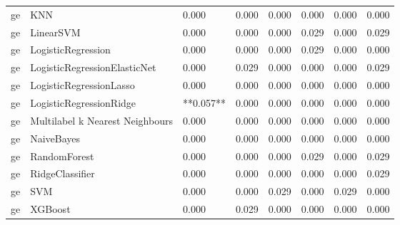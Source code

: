 \begin{tabular}{llllllll}
      ge &                             KNN &     0.000 &                     0.000 &                 0.000 &                  0.000 &                                   0.000 &     0.000 \\
      ge &                       LinearSVM &     0.000 &                     0.000 &                 0.000 &                  0.029 &                                   0.000 &     0.029 \\
      ge &              LogisticRegression &     0.000 &                     0.000 &                 0.000 &                  0.029 &                                   0.000 &     0.000 \\
      ge &    LogisticRegressionElasticNet &     0.000 &                     0.029 &                 0.000 &                  0.000 &                                   0.000 &     0.029 \\
      ge &         LogisticRegressionLasso &     0.000 &                     0.000 &                 0.000 &                  0.000 &                                   0.000 &     0.000 \\
      ge &         LogisticRegressionRidge & **0.057** &                     0.000 &                 0.000 &                  0.000 &                                   0.000 &     0.000 \\
      ge & Multilabel k Nearest Neighbours &     0.000 &                     0.000 &                 0.000 &                  0.000 &                                   0.000 &     0.000 \\
      ge &                      NaiveBayes &     0.000 &                     0.000 &                 0.000 &                  0.000 &                                   0.000 &     0.000 \\
      ge &                    RandomForest &     0.000 &                     0.000 &                 0.000 &                  0.029 &                                   0.000 &     0.029 \\
      ge &                 RidgeClassifier &     0.000 &                     0.000 &                 0.000 &                  0.000 &                                   0.000 &     0.029 \\
      ge &                             SVM &     0.000 &                     0.000 &                 0.029 &                  0.000 &                                   0.029 &     0.000 \\
      ge &                         XGBoost &     0.000 &                     0.029 &                 0.000 &                  0.000 &                                   0.000 &     0.000 \\

\end{tabular}
